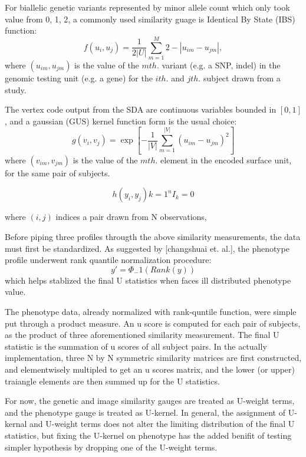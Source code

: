\documentclass[twocolumn]{article}
\begin{document}
For biallelic genetic variants represented by minor allele count which only took value from {0, 1, 2}, a commonly used similarity guage is Identical By State (IBS) function:
\begin{displaymath}
f(u_i,u_j)=\frac{1}{2|U|}\sum_{m=1}^M{2-|u_{im}-u_{jm}|},
\end{displaymath}
where $(u_{im},u_{jm})$ is the value of the $m th.$ variant (e.g. a SNP, indel) in the genomic testing unit (e.g. a gene) for the $i th.$ and $j th.$ subject drawn from a study.

The vertex code output from the SDA are continuous variables bounded in $[0,1]$, and a gaussian (GUS) kernel function form is the usual choice:
\begin{displaymath}
g(v_i,v_j)=\exp{[-\frac{1}{|V|}\sum_{m=1}^{|V|}{(u_{im}-u_{jm})^2}]}
\end{displaymath}
where $(v_{im},v_{jm})$ is the value of the $m th.$ element in the encoded surface unit, for the same pair of subjects.

\begin{displaymath}
h(y_i,y_j){k=1}^{n} I_k = 0
\end{displaymath}

where $(i,j)$ indices a pair drawn from N observations, 

Before piping three profiles througth the above similarity measurements, the data must first be standardized. As suggested by [changshuai et. al.], the phenotype profile underwent rank quantile normalization procedure:
\begin{displaymath}
y'= \Phi_-1 (Rank(y))
\end{displaymath}
which helps stablized the final U statistics when faces ill distributed phenotype value. 

The phenotype data, already normalized with rank-quntile function, were simple put through a product measure. An u score is computed for each pair of subjects, as the product of three aforementioned similarity measurement. The final U statistic is the summation of u scores of all subject pairs. In the actually implementation,  three N by N symmetric similarity matrices are first constructed, and elementwisely multipled to get an u scores matrix, and the lower (or upper) traiangle elements are then summed up for the U statistics.

For now, the genetic and image similarity gauges are treated as U-weight terms, and the phenotype gauge is treated as U-kernel. In general, the assignment of U-kernal and U-weight terms does not alter the limiting distribution of the final U statistics, but fixing the U-kernel on phenotype has the added benifit of testing simpler hypothesis by dropping one of the U-weight terms.

\end{document}
